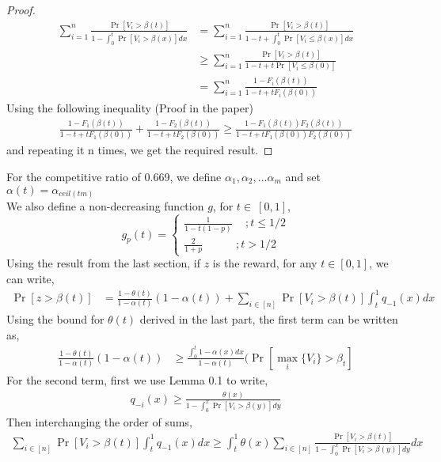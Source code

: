 \documentclass[10pt, letterpaper, twoside]{article}
\begin{document}
	\begin{proof}
		\begin{align*}
			\sum_{i=1}^{n} \frac{\Pr[V_{i}>\beta(t)]}{1-\int_{0}^{t} \Pr[V_{i}>\beta(x)] dx} &= \sum_{i=1}^{n} \frac{\Pr[V_{i}>\beta(t)]}{1-t+\int_{0}^{t} \Pr[V_{i}\leq\beta(x)] dx}\\
			&\geq \sum_{i=1}^{n} \frac{\Pr[V_{i}>\beta(t)]}{1-t+t\Pr[V_{i}\leq\beta(0)]}\\
			&=\sum_{i=1}^{n} \frac{1-F_{i}(\beta(t))}{1-t+tF_{i}(\beta(0))}
		\end{align*}
		Using the following inequality	 (Proof in the paper)
		\begin{align*} 
			\frac{1-F_{1}(\beta(t))}{1-t+tF_{1}(\beta(0))} + \frac{1-F_{2}(\beta(t))}{1-t+tF_{2}(\beta(0))} \geq \frac{1-F_{1}(\beta(t))F_{2}(\beta(t))}{1-t+tF_{1}(\beta(0))F_{2}(\beta(0))} 
		\end{align*}  
		and repeating it n times, we get the required result.
	\end{proof}
	For the competitive ratio of 0.669, we define $\alpha_{1}, \alpha_{2},...\alpha_{m}$ and set $\alpha(t) = \alpha_{ceil(tm)}$\\
	We also define a non-decreasing function $g$, for $t \in\ [0,1]$,
	$$g_{p}(t) = \begin{cases}
	\frac{1}{1-t(1-p)}  \quad \,; t \leq 1/2 \\
	\frac{2}{1+p} \quad \quad \quad; t > 1/2
	\end{cases}
	$$
	Using the result from the last section, if $z$ is the reward, for any $t \in [0,1]$, we can write,\\
	\begin{align*}
		\Pr[z > \beta(t)] &= \frac{1-\theta(t)}{1-\alpha(t)} (1-\alpha(t)) + \sum_{i \in [n]} \Pr[V_{i} > \beta(t)] \int_{t}^{1} q_{-1}(x) dx
	\end{align*}
	Using the bound for $\theta(t)$ derived in the last part, the first term can be written as,
	\begin{align*}
		\frac{1-\theta(t)}{1-\alpha(t)} (1-\alpha(t)) &\geq \frac{\int_{0}^{t} 1 - \alpha(x) dx}{1-\alpha(t)} (\Pr[\max_{i} \{V_{i}\} > \beta_{t}]
	\end{align*}
	For the second term, first we use Lemma 0.1 to write,
	\begin{align*}
		q_{-i}(x) \geq \frac{\theta(x)}{1-\int_{0}^{x} \Pr[V_{i} > \beta(y)]  dy}
	\end{align*}
	Then interchanging the order of sums,
	\begin{align*}
		\sum_{i \in [n]} \Pr[V_{i} > \beta(t)] \int_{t}^{1} q_{-1}(x) dx \geq \int_{t}^{1} \theta(x) \sum_{i \in [n]} \frac{\Pr[V_{i} > \beta(t)]}{1 - \int_{0}^{x} \Pr[V_{i} > \beta(y)] dy} dx
	\end{align*}
\end{document}
